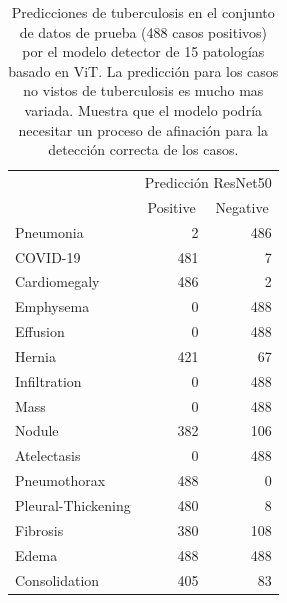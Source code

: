 \begin{table}[!ht]
    \centering
    \begin{tabular}{lcr}
                                   & \multicolumn{2}{c}{Predicción ResNet50}                                \\ \cline{2-3}
    \multicolumn{1}{l|}{}          & \multicolumn{1}{c|}{Positive} & \multicolumn{1}{c|}{Negative} \\ \hline
    \multicolumn{1}{|l|}{Pneumonia}& \multicolumn{1}{r|}{2}      & \multicolumn{1}{r|}{486}      \\ \hline
    \multicolumn{1}{|l|}{COVID-19}  & \multicolumn{1}{r|}{481}        & \multicolumn{1}{r|}{7}     \\ \hline
    \multicolumn{1}{|l|}{Cardiomegaly}  & \multicolumn{1}{r|}{486}        & \multicolumn{1}{r|}{2}     \\ \hline
    \multicolumn{1}{|l|}{Emphysema}  & \multicolumn{1}{r|}{0}        & \multicolumn{1}{r|}{488}     \\ \hline
    \multicolumn{1}{|l|}{Effusion}  & \multicolumn{1}{r|}{0}        & \multicolumn{1}{r|}{488}     \\ \hline
    \multicolumn{1}{|l|}{Hernia}  & \multicolumn{1}{r|}{421}        & \multicolumn{1}{r|}{67}     \\ \hline
    \multicolumn{1}{|l|}{Infiltration}  & \multicolumn{1}{r|}{0}        & \multicolumn{1}{r|}{488}     \\ \hline
    \multicolumn{1}{|l|}{Mass}  & \multicolumn{1}{r|}{0}        & \multicolumn{1}{r|}{488}     \\ \hline
    \multicolumn{1}{|l|}{Nodule}  & \multicolumn{1}{r|}{382}        & \multicolumn{1}{r|}{106}     \\ \hline
    \multicolumn{1}{|l|}{Atelectasis}  & \multicolumn{1}{r|}{0}        & \multicolumn{1}{r|}{488}     \\ \hline
    \multicolumn{1}{|l|}{Pneumothorax}  & \multicolumn{1}{r|}{488}        & \multicolumn{1}{r|}{0}     \\ \hline
    \multicolumn{1}{|l|}{Pleural-Thickening }  & \multicolumn{1}{r|}{480}        & \multicolumn{1}{r|}{8}     \\ \hline
    \multicolumn{1}{|l|}{Fibrosis}  & \multicolumn{1}{r|}{380}        & \multicolumn{1}{r|}{108}     \\ \hline
    \multicolumn{1}{|l|}{Edema}  & \multicolumn{1}{r|}{488}        & \multicolumn{1}{r|}{488}     \\ \hline
    \multicolumn{1}{|l|}{Consolidation}  & \multicolumn{1}{r|}{405}        & \multicolumn{1}{r|}{83}     \\ \hline


    \end{tabular}
    \caption{Predicciones de tuberculosis en el conjunto de datos de prueba (488 casos positivos) por el modelo
             detector de 15 patologías basado en ViT. La predicción para los casos no vistos de tuberculosis
             es mucho mas variada. Muestra que el modelo podría necesitar un proceso de afinación para la
             detección correcta de los casos.}
    \label{table_tb1vit_15}
\end{table}
